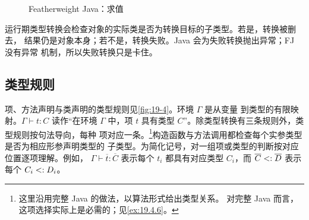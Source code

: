 \begin{figure}[!ht]
\centering
\begin{minipage}{0.98\linewidth}
\scriptsize
{}
\noindent\hfill{}\par
{}
\end{minipage}
\caption{Featherweight Java：求值}
\label{fig:19-3}
\end{figure}

运行期类型转换会检查对象的实际类是否为转换目标的子类型。若是，转换被删去，
结果仍是对象本身；若不是，转换失败。Java 会为失败转换抛出异常；FJ 没有异常
机制，所以失败转换只是卡住。

\subsection*{类型规则}

项、方法声明与类声明的类型规则见\cref{fig:19-4}。环境 \(\Gamma\) 是从变量
到类型的有限映射。\(\Gamma\vdash t:C\) 读作“在环境 \(\Gamma\) 中，项
\(t\) 具有类型 \(C\)”。除类型转换有三条规则外，类型规则按句法导向，每种
项对应一条。\footnote{这里沿用完整 Java 的做法，以算法形式给出类型关系。
对完整 Java 而言，这项选择实际上是必需的；见\cref{ex:19.4.6}。}构造函数与方法调用都检查每个实参类型是否为相应形参声明类型的
子类型。为简化记号，对一组项或类型的判断按对应位置逐项理解。例如，
\(\Gamma\vdash\overline t:\overline C\) 表示每个 \(t_i\) 都具有对应类型
\(C_i\)，而 \(\overline C\mathrel{<:}\overline D\) 表示每个
\(C_i\mathrel{<:} D_i\)。

